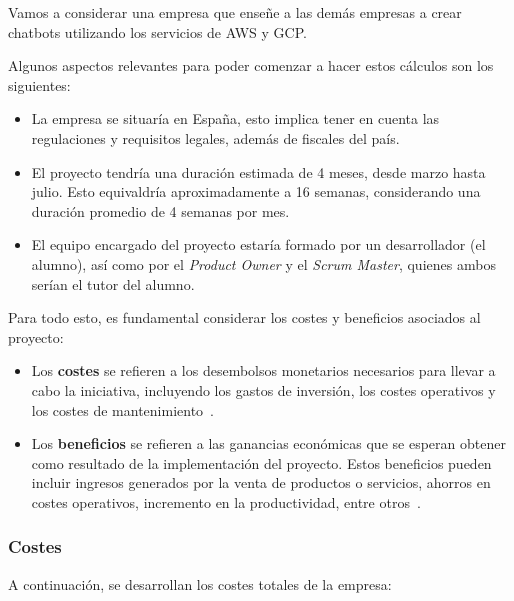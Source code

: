 Vamos a considerar una empresa que enseñe a las demás empresas a crear chatbots utilizando
los servicios de AWS y GCP.

Algunos aspectos relevantes para poder comenzar a hacer estos cálculos son los siguientes:
\begin{itemize}
	\item La empresa se situaría en España, esto implica tener en cuenta las
		regulaciones y requisitos legales, además de fiscales del país.

	\item El proyecto tendría una duración estimada de 4 meses, desde marzo hasta
		julio. Esto equivaldría aproximadamente a 16 semanas, considerando una
		duración promedio de 4 semanas por mes.

	\item El equipo encargado del proyecto estaría formado por un desarrollador (el
		alumno), así como por el \textit{Product Owner} y el \textit{Scrum Master}, quienes
		ambos serían el tutor del alumno.
\end{itemize}

Para todo esto, es fundamental considerar los costes y beneficios asociados al
proyecto:
\begin{itemize}
	\item Los \textbf{costes} se refieren a los desembolsos monetarios necesarios
		para llevar a cabo la iniciativa, incluyendo los gastos de inversión, los
		costes operativos y los costes de mantenimiento~\cite{costebeneficio2006}.

	\item Los \textbf{beneficios} se refieren a las ganancias económicas que se
		esperan obtener como resultado de la implementación del proyecto. Estos beneficios
		pueden incluir ingresos generados por la venta de productos o servicios,
		ahorros en costes operativos, incremento en la productividad, entre otros~\cite{costebeneficio2006}.
\end{itemize}

\subsubsection{Costes}
A continuación, se desarrollan los costes totales de la empresa:


